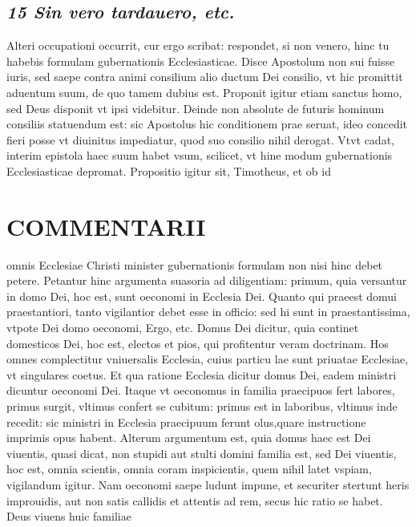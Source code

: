 \documentclass{article}
\begin{document}
\begin{pages}
\subsection*{\textit{15 Sin vero tardauero, etc. }}\pstart Alteri occupationi occurrit, cur ergo scribat: respondet, si non venero, hinc tu habebis formulam gubernationis Ecclesiasticae.  \pend\pstart Disce Apostolum non sui fuisse iuris, sed saepe contra animi consilium alio ductum Dei consilio, vt hic promittit aduentum suum, de quo tamem dubius est. Proponit igitur etiam sanctus homo, sed Deus disponit vt ipsi videbitur. Deinde non absolute de futuris hominum consiliis statuendum est: sic Apostolus hic conditionem prae seruat, ideo concedit fieri posse vt diuinitus impediatur, quod suo consilio nihil derogat. Vtvt cadat, interim epistola haec suum habet vsum, scilicet, vt hine modum gubernationis Ecclesiasticae depromat.  \pend\pstart Propositio igitur sit, Timotheus, et ob id  \pend
\section*{COMMENTARII }
\marginpar{[ p.78 ]}\pstart omnis Ecclesiae Christi minister gubernationis formulam non nisi hinc debet petere. Petantur hinc argumenta suasoria ad diligentiam: primum, quia versantur in domo Dei, hoc est, sunt oeconomi in Ecclesia Dei. Quanto qui praeest domui praestantiori, tanto vigilantior debet esse in officio: sed hi sunt in praestantissima, vtpote Dei domo oeconomi, Ergo, etc. Domus Dei dicitur, quia continet domesticos Dei, hoc est, electos et pios, qui profitentur veram doctrinam. Hos omnes complectitur vniuersalis Ecclesia, cuius particu lae sunt priuatae Ecclesiae, vt singulares coetus. Et qua ratione Ecclesia dicitur domus Dei, eadem ministri dicuntur oeconomi Dei. Itaque vt oeconomus in familia praecipuos fert labores, primus surgit, vltimus confert se cubitum: primus est in laboribus, vltimus inde recedit: sic ministri in Ecclesia praecipuum ferunt olus,quare instructione imprimis opus habent.  \pend\pstart Alterum argumentum est, quia domus haec est Dei viuentis, quasi dicat, non stupidi aut stulti domini familia est, sed Dei viuentis, hoc est, omnia scientis, omnia coram inspicientis, quem nihil latet vspiam, vigilandum igitur. Nam oeconomi saepe ludunt impune, et securiter stertunt heris improuidis, aut non satis callidis et attentis ad rem, secus hic ratio se habet. Deus viuens huic familiae  \pend

\end{pages}
\end{document}
